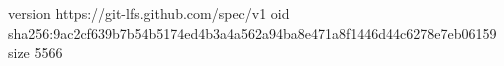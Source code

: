 version https://git-lfs.github.com/spec/v1
oid sha256:9ac2cf639b7b54b5174ed4b3a4a562a94ba8e471a8f1446d44c6278e7eb06159
size 5566
